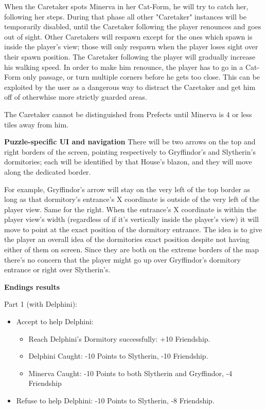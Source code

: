 When the Caretaker spots Minerva in her Cat-Form, he will try to catch her, following her steps. During that phase all other "Caretaker" instances will be temporarily disabled, until the Caretaker following the player renounces and goes out of sight. Other Caretakers will respawn except for the ones which spawn is inside the player's view; those will only respawn when the player loses sight over their spawn position. The Caretaker following the player will gradually increase his walking speed. In order to make him renounce, the player has to go in a Cat-Form only passage, or turn multiple corners before he gets too close. This can be exploited by the user as a dangerous way to distract the Caretaker and get him off of otherwhise more strictly guarded areas.

The Caretaker cannot be distinguished from Prefects until Minerva is 4 or less tiles away from him.


\textbf{Puzzle-specific UI and navigation}
There will be two arrows on the top and right borders of the screen, pointing respectively to Gryffindor's and Slytherin's dormitories; each will be identified by that House's blazon, and they will move along the dedicated border.

For example, Gryffindor's arrow will stay on the very left of the top border as long as that dormitory's entrance's X coordinate is outside of the very left of the player view. Same for the right. When the entrance's X coordinate is within the player view's width (regardless of if it's vertically inside the player's view) it will move to point at the exact position of the dormitory entrance. The idea is to give the player an overall idea of the dormitories exact position despite not having either of them on screen. Since they are both on the extreme borders of the map there's no concern that the player might go up over Gryffindor's dormitory entrance or right over Slytherin's.

\textbf{Endings results}

Part 1 (with Delphini):

\begin{itemize}
    \item Accept to help Delphini:
	\begin{itemize}
		\item Reach Delphini's Dormitory successfully: +10 Friendship.
		\item Delphini Caught: -10 Points to Slytherin, -10 Friendship.
		\item Minerva Caught: -10 Points to both Slytherin and Gryffindor, -4 Friendship
	\end{itemize}
	\item Refuse to help Delphini: -10 Points to Slytherin, -8 Friendship.
\end{itemize}

